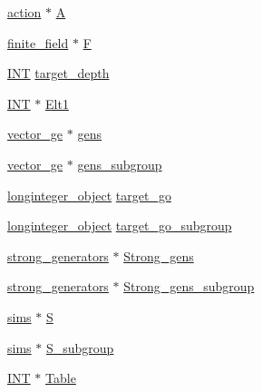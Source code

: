 \begin{DoxyCompactItemize}
\mbox{\hyperlink{classaction}{action}} $\ast$ \mbox{\hyperlink{classcayley__graph__search_a3f3b77766a1829e15500a47666e3c611}{A}}
\item 
\mbox{\hyperlink{classfinite__field}{finite\+\_\+field}} $\ast$ \mbox{\hyperlink{classcayley__graph__search_ac08624d4cf985dac42a5a93d05b9dae8}{F}}
\item 
\mbox{\hyperlink{galois_8h_a09fddde158a3a20bd2dcadb609de11dc}{I\+NT}} \mbox{\hyperlink{classcayley__graph__search_a361db837b607bed8b7264552a9695d81}{target\+\_\+depth}}
\item 
\mbox{\hyperlink{galois_8h_a09fddde158a3a20bd2dcadb609de11dc}{I\+NT}} $\ast$ \mbox{\hyperlink{classcayley__graph__search_a896bd820e20c14dd4451ed8ca94e85d0}{Elt1}}
\item 
\mbox{\hyperlink{classvector__ge}{vector\+\_\+ge}} $\ast$ \mbox{\hyperlink{classcayley__graph__search_a4c7ac1ba447eb2468673d921069ef785}{gens}}
\item 
\mbox{\hyperlink{classvector__ge}{vector\+\_\+ge}} $\ast$ \mbox{\hyperlink{classcayley__graph__search_acf8d77311cb5c629656e3e58b6b5e453}{gens\+\_\+subgroup}}
\item 
\mbox{\hyperlink{classlonginteger__object}{longinteger\+\_\+object}} \mbox{\hyperlink{classcayley__graph__search_af0b5d1eca51ad295afb7c5a3aaf9d4c9}{target\+\_\+go}}
\item 
\mbox{\hyperlink{classlonginteger__object}{longinteger\+\_\+object}} \mbox{\hyperlink{classcayley__graph__search_a6069949f871cc486783975bac61e49bf}{target\+\_\+go\+\_\+subgroup}}
\item 
\mbox{\hyperlink{classstrong__generators}{strong\+\_\+generators}} $\ast$ \mbox{\hyperlink{classcayley__graph__search_a6accfc9aac4dee754ab107709dee5eb6}{Strong\+\_\+gens}}
\item 
\mbox{\hyperlink{classstrong__generators}{strong\+\_\+generators}} $\ast$ \mbox{\hyperlink{classcayley__graph__search_a4e79b223b4a2d8995c0d1b9ef3b184b6}{Strong\+\_\+gens\+\_\+subgroup}}
\item 
\mbox{\hyperlink{classsims}{sims}} $\ast$ \mbox{\hyperlink{classcayley__graph__search_ac7c2dd56b11690522de936321f09ed22}{S}}
\item 
\mbox{\hyperlink{classsims}{sims}} $\ast$ \mbox{\hyperlink{classcayley__graph__search_a134b235cd5b5a5d9f2cdd1e8d791ea7d}{S\+\_\+subgroup}}
\item 
\mbox{\hyperlink{galois_8h_a09fddde158a3a20bd2dcadb609de11dc}{I\+NT}} $\ast$ \mbox{\hyperlink{classcayley__graph__search_a3ab442da9a28c0e6d63fea3697a7d1b8}{Table}}

\end{DoxyCompactItemize}
